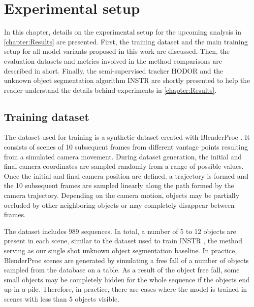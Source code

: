 \chapter{Experimental setup}\label{chapter:ExpSetup}

In this chapter, details on the experimental setup for the upcoming analysis in \autoref{chapter:Results} 
are presented. First, the training dataset and the main training setup for all model variants proposed in this work are discussed.  
Then, the evaluation datasets and metrics involved in the method comparisons are described in short. Finally, the semi-supervised tracker HODOR \parencite{athar2022hodor} and the unknown object segmentation algorithm INSTR \parencite{durner2021unknown} are shortly presented to help the reader understand the details behind experiments in \autoref{chapter:Results}.

\section{Training dataset}\label{chapter:Dataset}
The dataset used for training is a synthetic dataset created with BlenderProc \parencite{denninger2019blenderproc}. It consists of scenes of 10 subsequent frames from different vantage points resulting from a simulated camera movement. During dataset generation, the initial and final camera coordinates are sampled randomly from a range of possible values.
Once the initial and final camera position are defined, a trajectory is formed and the 10 subsequent frames are sampled linearly along the path formed by the camera trajectory. Depending on the camera motion, objects may be partially occluded by other neighboring objects or may completely disappear between frames. \par

The dataset includes 989 sequences. In total, a number of 5 to 12 objects are present in each scene, similar to the dataset used to train INSTR \parencite{durner2021unknown}, the method serving as our single shot unknown object segmentation baseline. In practice, \gls{BlenderProc} scenes are generated by simulating a free fall of a number of objects sampled from the database on a table. As a result of the object free fall, some small objects may be completely hidden for the whole sequence if the objects end up in a pile. Therefore, in practice, there are cases where the model is trained in scenes with less than 5 objects visible. \par 


